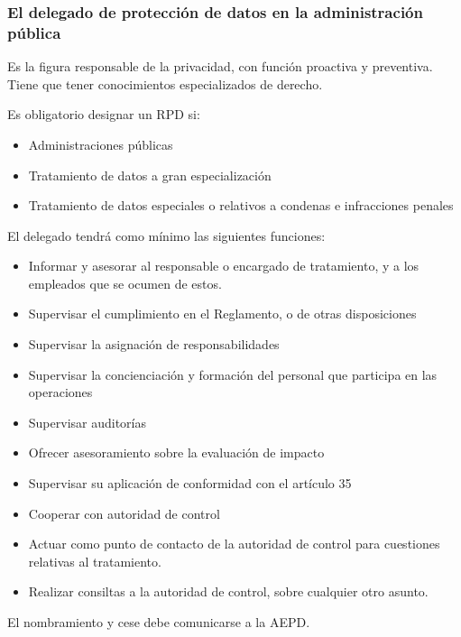     \subsubsection{El delegado de protección de datos en la administración pública}
        Es la figura responsable de la privacidad, con función proactiva y preventiva. Tiene que tener conocimientos especializados de derecho. 
        
        Es obligatorio designar un RPD si:
        \begin{itemize}
            \item Administraciones públicas
            \item Tratamiento de datos a gran especialización
            \item Tratamiento de datos especiales o relativos a condenas e infracciones penales
        \end{itemize}
        
        El delegado tendrá como mínimo las siguientes funciones:
        \begin{itemize}
            \item Informar y asesorar al responsable o encargado de tratamiento, y a los empleados que se ocumen de estos.
            \item Supervisar el cumplimiento en el Reglamento, o de otras disposiciones
            \item Supervisar la asignación de responsabilidades
            \item Supervisar la concienciación y formación del personal que participa en las operaciones
            \item Supervisar auditorías
            \item Ofrecer asesoramiento sobre la evaluación de impacto
            \item Supervisar su aplicación de conformidad con el artículo 35
            \item Cooperar con autoridad de control
            \item Actuar como punto de contacto de la autoridad de control para cuestiones relativas al tratamiento.
            \item Realizar consiltas a la autoridad de control, sobre cualquier otro asunto.
        \end{itemize}

        El nombramiento y cese debe comunicarse a la AEPD.

